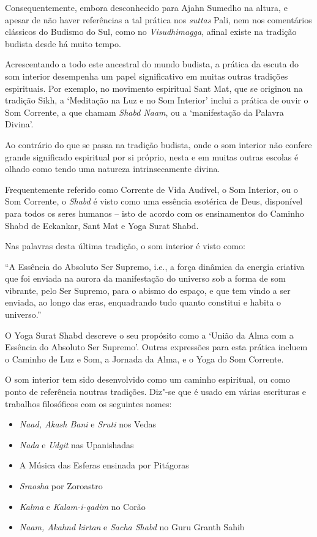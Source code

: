 Consequentemente, embora desconhecido para Ajahn Sumedho na altura, e
apesar de não haver referências a tal prática nos \emph{suttas} Pali,
nem nos comentários clássicos do Budismo do Sul, como no
\emph{Visudhimagga}, afinal existe na tradição budista desde há muito
tempo.

Acrescentando a todo este ancestral do mundo budista, a prática da
escuta do som interior desempenha um papel significativo em muitas
outras tradições espirituais. Por exemplo, no movimento espiritual Sant
Mat, que se originou na tradição Sikh, a `Meditação na Luz e no Som
Interior' inclui a prática de ouvir o Som Corrente, a que chamam
\emph{Shabd Naam}, ou a `manifestação da Palavra Divina'.

Ao contrário do que se passa na tradição budista, onde o som interior
não confere grande significado espiritual por si próprio, nesta e em
muitas outras escolas é olhado como tendo uma natureza intrinsecamente
divina.

Frequentemente referido como Corrente de Vida Audível, o Som Interior,
ou o Som Corrente, o \emph{Shabd} é visto como uma essência esotérica de
Deus, disponível para todos os seres humanos -- isto de acordo com os
ensinamentos do Caminho Shabd de Eckankar, Sant Mat e Yoga Surat Shabd.

Nas palavras desta última tradição, o som interior é visto como:

``A Essência do Absoluto Ser Supremo, i.e., a força dinâmica da energia
criativa que foi enviada na aurora da manifestação do universo sob a
forma de som vibrante, pelo Ser Supremo, para o abismo do espaço, e que
tem vindo a ser enviada, ao longo das eras, enquadrando tudo quanto
constitui e habita o universo.''\cite{shabd}

O Yoga Surat Shabd descreve o seu propósito como a `União da Alma com a
Essência do Absoluto Ser Supremo'. Outras expressões para esta prática
incluem o Caminho de Luz e Som, a Jornada da Alma, e o Yoga do Som
Corrente.

O som interior tem sido desenvolvido como um caminho espiritual, ou como
ponto de referência noutras tradições. Diz"-se que é usado em várias
escrituras e trabalhos filosóficos com os seguintes nomes:

\begin{itemize}
\item \emph{Naad, Akash Bani} e \emph{Sruti} nos Vedas
\item \emph{Nada} e \emph{Udgit} nas Upanishadas
\item A Música das Esferas ensinada por Pitágoras
\item \emph{Sraosha} por Zoroastro
\item \emph{Kalma} e \emph{Kalam-i-qadim} no Corão
\item \emph{Naam, Akahnd kirtan} e \emph{Sacha Shabd} no Guru Granth Sahib
\end{itemize}


